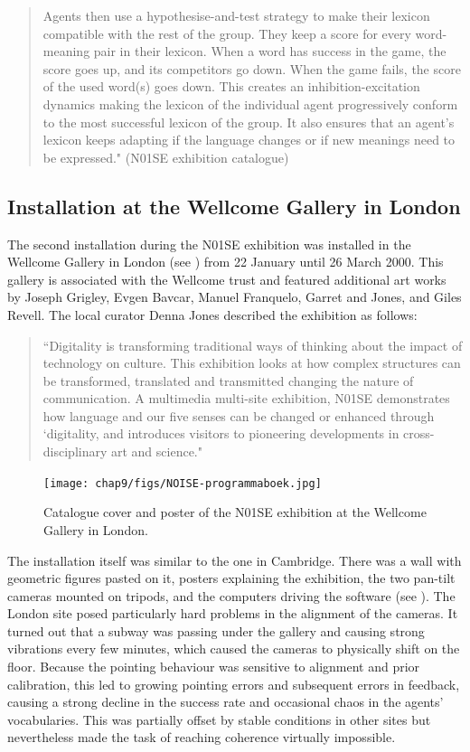 \begin{quotation}
Agents then use a hypothesise-and-test strategy to make their lexicon compatible with the rest of the group. They keep a score for every word-meaning pair in their lexicon. When a word has success in the game, the score goes up, and its competitors go down. When the game fails, the score of the used word(s) goes down. This creates an inhibition-excitation dynamics making the lexicon of the individual agent progressively conform to the most successful lexicon of the group. It also ensures that an agent's lexicon keeps adapting if the language changes or if new meanings need to be expressed." (N01SE exhibition catalogue)
\end{quotation}

\subsection{Installation at the Wellcome Gallery in London} 

The second installation during the N01SE exhibition was installed in the Wellcome Gallery in London 
(see ) 
from 22 January until 26 March 2000. This gallery is associated with the Wellcome trust and featured additional 
art works by Joseph Grigley, Evgen Bavcar, Manuel Franquelo, Garret and Jones, and Giles Revell. The local curator
Denna Jones described the exhibition as follows: 

\begin{quotation}
``Digitality is transforming traditional ways of thinking about the impact of technology on culture. This exhibition 
looks at how complex structures can be transformed, translated and transmitted changing the nature of communication. 
A multimedia multi-site exhibition, N01SE demonstrates how language and our five senses can be changed or 
enhanced through `digitality, and introduces visitors to pioneering developments in cross-disciplinary art and 
science."
\end{quotation}

\begin{figure}[htbp]
  \centerline{\texttt{[image: chap9/figs/NOISE-programmaboek.jpg]}}
\caption{\label{fig:program}Catalogue cover and poster of the N01SE exhibition at the Wellcome Gallery in London.}
\end{figure}

The installation itself was similar to the one in Cambridge. There was a wall with 
geometric figures pasted on it, posters explaining the exhibition, the two pan-tilt cameras mounted on tripods, 
and the computers driving the software (see ). The London site posed particularly hard 
problems in the alignment of the cameras. 
It turned out that a subway was passing under the gallery and causing strong vibrations 
every few minutes, which caused the cameras to physically shift on the floor. Because the pointing behaviour was sensitive 
to alignment and prior calibration, this led to growing pointing errors and 
subsequent errors in feedback, causing a strong decline in 
the success rate and occasional chaos in the agents' vocabularies. This was partially offset by stable conditions in 
other sites but nevertheless made the task of reaching coherence virtually impossible. 

